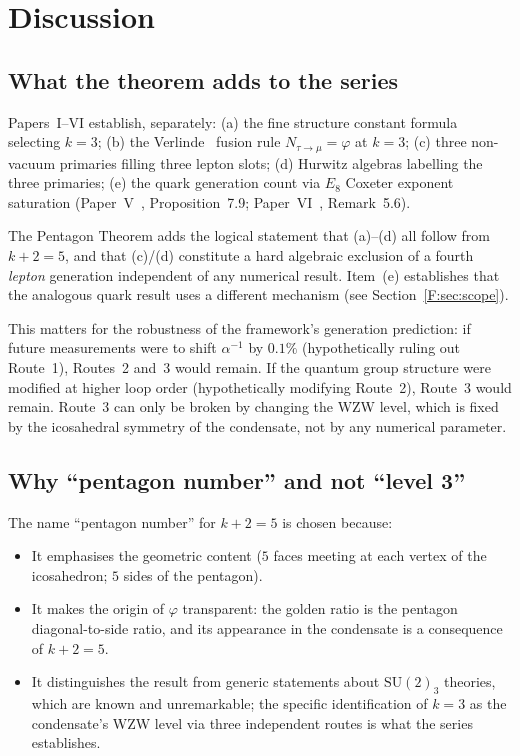 \documentclass[11pt,a4paper]{article}
\theoremstyle{definition}
\theoremstyle{remark}
\newcommand{\vp}{\varphi}
\begin{document}
\section{Discussion}
\label{F:sec:discussion}

\subsection{What the theorem adds to the series}

Papers~I--VI establish, separately:
(a) the fine structure constant formula selecting $k=3$;
(b) the Verlinde~\cite{Verlinde1988} fusion rule $N_{\tau\to\mu} = \vp$ at $k=3$;
(c) three non-vacuum primaries filling three lepton slots;
(d) Hurwitz algebras labelling the three primaries;
(e) the quark generation count via $E_8$ Coxeter exponent saturation
  (Paper~V~\cite{Paper5}, Proposition~7.9; Paper~VI~\cite{Paper6},
  Remark~5.6).

The Pentagon Theorem adds the logical statement that (a)--(d) all
follow from $k+2=5$, and that (c)/(d) constitute a hard algebraic
exclusion of a fourth \emph{lepton} generation independent of any
numerical result.
Item~(e) establishes that the analogous quark result uses a different
mechanism (see Section~\ref{F:sec:scope}).

This matters for the robustness of the framework's generation prediction:
if future measurements were to shift $\alpha^{-1}$ by $0.1\%$
(hypothetically ruling out Route~1), Routes~2 and~3 would remain.
If the quantum group structure were modified at higher loop order
(hypothetically modifying Route~2), Route~3 would remain.
Route~3 can only be broken by changing the WZW level, which is fixed
by the icosahedral symmetry of the condensate, not by any numerical
parameter.

\subsection{Why ``pentagon number'' and not ``level 3''}

The name ``pentagon number'' for $k+2=5$ is chosen because:
\begin{itemize}
\item It emphasises the geometric content ($5$ faces meeting at each
  vertex of the icosahedron; $5$ sides of the pentagon).
\item It makes the origin of $\vp$ transparent: the golden ratio is
  the pentagon diagonal-to-side ratio, and its appearance in the
  condensate is a consequence of $k+2=5$.
\item It distinguishes the result from generic statements about
  $\mathrm{SU}(2)_3$ theories, which are known and unremarkable;
  the specific identification of $k=3$ as the condensate's WZW level
  via three independent routes is what the series establishes.
\end{itemize}
\end{document}
